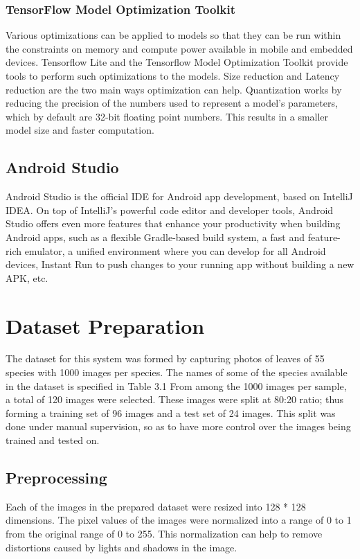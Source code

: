\subsubsection{TensorFlow Model Optimization Toolkit}
Various optimizations can be applied to models so that they can be run within the constraints on memory and compute power available in mobile and embedded devices. Tensorflow Lite and the Tensorflow Model Optimization Toolkit provide tools to perform such optimizations to the models. Size reduction and Latency reduction are the two main ways optimization can help. Quantization works by reducing the precision of the numbers used to represent a model's parameters, which by default are 32-bit floating point numbers. This results in a smaller model size and faster computation.

\subsection{Android Studio}
Android Studio is the official IDE for Android app development, based on IntelliJ IDEA. On top of IntelliJ’s powerful code editor and developer tools, Android Studio offers even more features that enhance your productivity when building Android apps, such as a flexible Gradle-based build system, a fast and feature-rich emulator, a unified environment where you can develop for all Android devices, Instant Run to push changes to your running app without building a new APK, etc.

\section{Dataset Preparation}
The dataset for this system was formed by capturing photos of leaves of 55 species with 1000 images per species. The names of some of the species available in the dataset is specified in Table 3.1 From among the 1000 images per sample, a total of 120 images were selected. These images were split at 80:20 ratio; thus forming a training set of 96 images and a test set of 24 images. This split was done under manual supervision, so as to have more control over the images being trained and tested on.

\subsection{Preprocessing}
Each of the images in the prepared dataset were resized into 128 * 128 dimensions. The pixel values of the images were normalized into a range of 0 to 1 from the original range of 0 to 255. This normalization can help to remove distortions caused by lights and shadows in the image.

